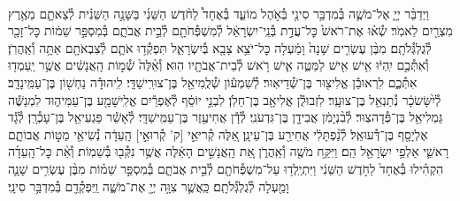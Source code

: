\documentclass[twoside, openany, parskip=half, 11pt]{book}
\begin{document}
\begin{footnotesize}
\begin{multicols}{2}
\\
וַיְדַבֵּ֨ר יְיָ֧ אֶל־מֹשֶׁ֛ה בְּ֯מִדְבַּ֥ר סִינַ֖י בְּ֯אֹ֣הֶל מוֹעֵ֑ד בְּ֯אֶחָד֩ לַחֹ֨דֶשׁ הַשֵּׁנִ֜י בַּשָּׁנָ֣ה הַשֵּׁנִ֗ית לְ֯צֵאתָ֛ם מֵאֶ֥רֶץ מִצְרַ֖יִם לֵאמֹֽר׃ שְׂ֯א֗וּ אֶת־רֹאשׁ֙ כׇּל־עֲדַ֣ת בְּ֯נֵֽי־יִשְׂרָאֵ֔ל לְ֯מִשְׁפְּ֯חֹתָ֖ם לְ֯בֵ֣ית אֲבֹתָ֑ם בְּ֯מִסְפַּ֣ר שֵׁמ֔וֹת כׇּל־זָכָ֖ר לְ֯גֻלְגְּ֯לֹתָֽם׃ מִבֶּ֨ן עֶשְׂרִ֤ים שָׁנָה֙ וָמַ֔עְלָה כׇּל־יֹצֵ֥א צָבָ֖א בְּ֯יִשְׂרָאֵ֑ל תִּפְקְ֯ד֥וּ אֹתָ֛ם לְ֯צִבְאֹתָ֖ם אַתָּ֥ה וְ֯אַֽהֲרֹֽן׃ וְ֯אִתְּ֯כֶ֣ם יִֽהְי֔וּ אִ֥ישׁ אִ֖ישׁ לַמַּטֶּ֑ה אִ֛ישׁ רֹ֥אשׁ לְ֯בֵית־אֲבֹתָ֖יו הֽוּא׃  וְ֯אֵ֨לֶּה֙ שְׁ֯מ֣וֹת הָֽאֲנָשִׁ֔ים אֲשֶׁ֥ר יַֽעַמְד֖וּ אִתְּ֯כֶ֑ם לִרְאוּבֵ֕ן אֱלִיצ֖וּר בֶּן־שְׁ֯דֵיאֽוּר׃ לְ֯שִׁמְע֕וֹן שְׁ֯לֻֽמִיאֵ֖ל בֶּן־צוּרִֽישַׁדָּֽי׃ לִֽיהוּדָ֕ה נַחְשׁ֖וֹן בֶּן־עַמִּֽינָדָֽב׃ לְ֯יִ֨שָּׂשׂכָ֔ר נְ֯תַנְאֵ֖ל בֶּן־צוּעָֽר׃ לִזְבוּלֻ֕ן אֱלִיאָ֖ב בֶּן־חֵלֹֽן׃ לִבְנֵ֣י יוֹסֵ֔ף לְ֯אֶפְרַ֕יִם אֱלִֽישָׁמָ֖ע בֶּן־עַמִּיה֑וּד לִמְנַשֶּׁ֕ה גַּמְלִיאֵ֖ל בֶּן־פְּ֯דָהצֽוּר׃ לְ֯בִ֨נְיָמִ֔ן אֲבִידָ֖ן בֶּן־גִּדְעֹנִֽי׃ לְ֯דָ֕ן אֲחִיעֶ֖זֶר בֶּן־עַמִּֽישַׁדָּֽי׃ לְ֯אָשֵׁ֕ר פַּגְעִיאֵ֖ל בֶּן־עָכְ֯רָֽן׃ לְ֯גָ֕ד אֶלְיָסָ֖ף בֶּן־דְּ֯עוּאֵֽל׃ לְ֯נַ֨פְתָּלִ֔י אֲחִירַ֖ע בֶּן־עֵינָֽן׃ אֵ֚לֶּה קְ֯ריּאֵ֣י [ק' קְ֯רוּאֵ֣י] הָֽעֵדָ֔ה נְ֯שִׂיאֵ֖י מַטּ֣וֹת אֲבוֹתָ֑ם רָאשֵׁ֛י אַלְפֵ֥י יִשְׂרָאֵ֖ל הֵֽם׃  וַיִּקַּ֥ח מֹשֶׁ֖ה וְ֯אַֽהֲרֹ֑ן אֵ֚ת הָֽאֲנָשִׁ֣ים הָאֵ֔לֶּה אֲשֶׁ֥ר נִקְּ֯ב֖וּ בְּ֯שֵׁמֽוֹת׃ וְ֯אֵ֨ת כׇּל־הָֽעֵדָ֜ה הִקְהִ֗ילוּ בְּ֯אֶחָד֙ לַחֹ֣דֶשׁ הַשֵּׁנִ֔י וַיִּתְיַֽלְד֥וּ עַל־מִשְׁפְּ֯חֹתָ֖ם לְ֯בֵ֣ית אֲבֹתָ֑ם בְּ֯מִסְפַּ֣ר שֵׁמ֗וֹת מִבֶּ֨ן עֶשְׂרִ֥ים שָׁנָ֛ה וָמַ֖עְלָה לְ֯גֻלְגְּ֯לֹתָֽם׃ כַּֽאֲשֶׁ֛ר צִוָּ֥ה יְיָ֖ אֶת־מֹשֶׁ֑ה וַֽיִּפְקְ֯דֵ֖ם בְּ֯מִדְבַּ֥ר סִינָֽי׃


\end{multicols}
\end{footnotesize}
\end{document}
